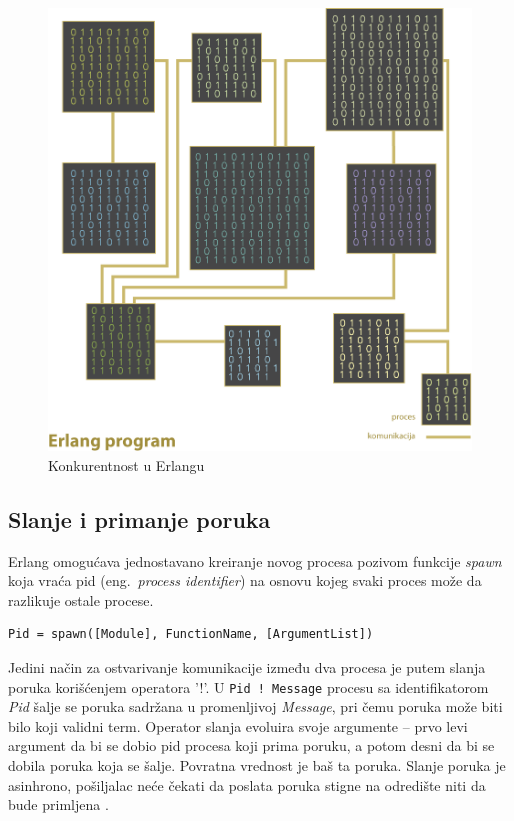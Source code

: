 \documentclass[a4paper]{article}
\begin{document}
{\begin{figure}[h!]
\begin{center}
\includegraphics[scale=0.5]{concurrency.png}
\end{center}
\caption{Konkurentnost u Erlangu}
\label{fig:concurrency}
\end{figure} 

\subsection{Slanje i primanje poruka}
Erlang omogućava jednostavano kreiranje novog procesa pozivom funkcije {\em spawn} koja vraća pid (eng.~{\em process identifier}) na osnovu kojeg svaki proces može da razlikuje ostale procese.
\begin{verbatim}
Pid = spawn([Module], FunctionName, [ArgumentList]) 
\end{verbatim}

Jedini način za ostvarivanje komunikacije između dva procesa je putem slanja poruka korišćenjem operatora '!'. U {\texttt{Pid ! Message}} procesu sa identifikatorom {\em Pid} šalje se poruka sadržana u promenljivoj {\em Message}, 
pri čemu poruka može biti bilo koji validni term. 
Operator slanja evoluira svoje argumente – prvo levi argument da bi se dobio pid procesa koji prima poruku, 
a potom desni da bi se dobila poruka koja se šalje. 
Povratna vrednost je baš ta poruka.
Slanje poruka je asinhrono, pošiljalac neće čekati da poslata poruka stigne na odredište niti da bude primljena \cite{book_joe, book_concurrent}.\\

}
\end{document}

